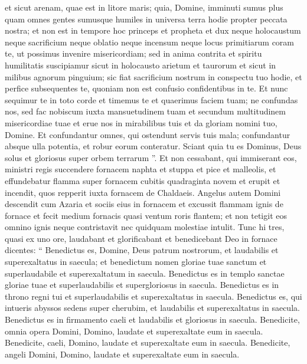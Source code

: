 \begin{biblechapter}
\begin{biblechapter}
\begin{biblechapter}
 et sicut arenam, quae est in litore maris;
 \verse quia, Domine,
 imminuti sumus plus quam omnes gentes
 sumusque humiles in universa terra
 hodie propter peccata nostra;
 \verse et non est in tempore hoc
 princeps et propheta et dux
 neque holocaustum neque sacrificium
 neque oblatio neque incensum
 neque locus primitiarum coram te,
 ut possimus invenire misericordiam;
 \verse sed in anima contrita et spiritu humilitatis suscipiamur
 sicut in holocausto arietum et taurorum
 \verse et sicut in milibus agnorum pinguium;
 sic fiat sacrificium nostrum in conspectu tuo hodie,
 et perfice subsequentes te,
 quoniam non est confusio confidentibus in te.
 \verse Et nunc sequimur te in toto corde
 et timemus te et quaerimus faciem tuam;
 \verse ne confundas nos,
 sed fac nobiscum iuxta mansuetudinem tuam
 et secundum multitudinem misericordiae tuae
 \verse et erue nos in mirabilibus tuis
 et da gloriam nomini tuo, Domine. 
\verse Et confundantur omnes, qui ostendunt servis tuis mala;
 confundantur absque ulla potentia,
 et robur eorum conteratur.
 \verse Sciant quia tu es Dominus,
 Deus solus et gloriosus super orbem terrarum ”.
 \verse Et non cessabant, qui immiserant eos, ministri regis succendere fornacem naphta et stuppa et pice et malleolis, 
\verse et effundebatur flamma super fornacem cubitis quadraginta novem 
\verse et erupit et incendit, quos repperit iuxta fornacem de Chaldaeis. 
\verse Angelus autem Domini descendit cum Azaria et sociis eius in fornacem et excussit flammam ignis de fornace 
\verse et fecit medium fornacis quasi ventum roris flantem; et non tetigit eos omnino ignis neque contristavit nec quidquam molestiae intulit.
 \verse Tunc hi tres, quasi ex uno ore, laudabant et glorificabant et benedicebant Deo in fornace dicentes:
 \verse “ Benedictus es, Domine, Deus patrum nostrorum,
 et laudabilis et superexaltatus in saecula;
 et benedictum nomen gloriae tuae sanctum
 et superlaudabile et superexaltatum in saecula.
 \verse Benedictus es in templo sanctae gloriae tuae
 et superlaudabilis et supergloriosus in saecula.
 \verse Benedictus es in throno regni tui
 et superlaudabilis et superexaltatus in saecula.
 \verse Benedictus es, qui intueris abyssos sedens super cherubim,
 et laudabilis et superexaltatus in saecula.
 \verse Benedictus es in firmamento caeli
 et laudabilis et gloriosus in saecula.
 \verse Benedicite, omnia opera Domini, Domino,
 laudate et superexaltate eum in saecula.
 \verse Benedicite, caeli, Domino,
 laudate et superexaltate eum in saecula.
 \verse Benedicite, angeli Domini, Domino,
 laudate et superexaltate eum in saecula.

\end{biblechapter}
\end{biblechapter}
\end{biblechapter}
